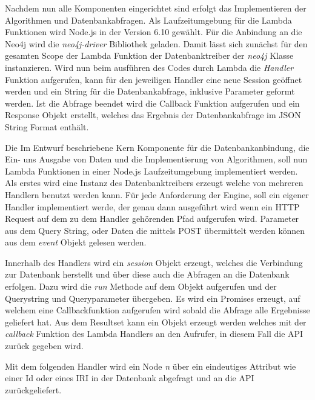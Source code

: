 Nachdem nun alle Komponenten eingerichtet sind erfolgt das Implementieren der Algorithmen und Datenbankabfragen. Als Laufzeitumgebung für die Lambda Funktionen wird Node.js in der Version 6.10 gewählt. Für die Anbindung an die Neo4j wird die \textit{neo4j-driver} Bibliothek geladen. Damit lässt sich zunächst für den gesamten Scope der Lambda Funktion der Datenbanktreiber der \textit{neo4j} Klasse instanzieren. 
Wird nun beim ausführen des Codes durch Lambda die \textit{Handler} Funktion aufgerufen, kann für den jeweiligen Handler eine neue Session geöffnet werden und ein String für die Datenbankabfrage, inklusive Parameter geformt werden. Ist die Abfrage beendet wird die Callback Funktion aufgerufen und ein Response Objekt erstellt, welches das Ergebnis der Datenbankabfrage im JSON String Format enthält.\newline

Die Im Entwurf beschriebene Kern Komponente für die Datenbankanbindung, die Ein- uns Ausgabe von Daten und die Implementierung von Algorithmen, soll nun Lambda Funktionen in einer Node.js Laufzeitumgebung implementiert werden. Als erstes wird eine Instanz des Datenbanktreibers erzeugt welche von mehreren Handlern benutzt werden kann. Für jede Anforderung der Engine, soll ein eigener Handler implementiert werde, der genau dann ausgeführt wird wenn ein HTTP Request auf dem zu dem Handler gehörenden Pfad aufgerufen wird. Parameter aus dem Query String, oder Daten die mittels POST übermittelt werden können aus dem \textit{event} Objekt gelesen werden. 
\newline

Innerhalb des Handlers wird ein \textit{session} Objekt erzeugt, welches die Verbindung zur Datenbank herstellt und über diese auch die Abfragen an die Datenbank erfolgen. Dazu wird die \textit{run} Methode auf dem Objekt aufgerufen und der Querystring und Queryparameter übergeben. Es wird ein Promises erzeugt, auf welchem eine Callbackfunktion aufgerufen wird sobald die Abfrage alle Ergebnisse geliefert hat. Aus dem Resultset kann ein Objekt erzeugt werden welches mit der \textit{callback} Funktion des Lambda Handlers an den Aufrufer, in diesem Fall die API zurück gegeben wird.

Mit dem folgenden Handler wird ein Node \textit{n} über ein eindeutiges Attribut wie einer Id oder eines IRI in der Datenbank abgefragt und an die API zurückgeliefert.\newline


